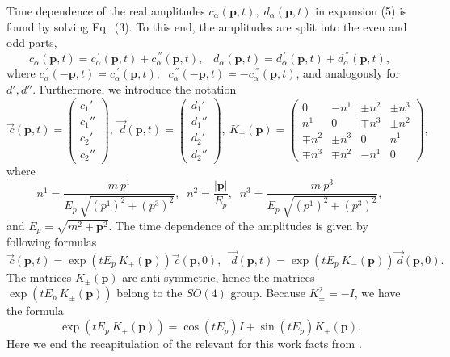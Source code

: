 \documentclass[12pt]{article}
\begin{document}
Time dependence of the real amplitudes $ c_{\alpha}(\mathbf{p},t), \;  d_{\alpha}(\mathbf{p},t) $ in expansion (5) is found  by solving Eq.\ (3). To this end,  the amplitudes are split into the even and odd parts, 
\[ c_{\alpha}(\mathbf{p},t) =  c_{\alpha}^{\:'}(\mathbf{p},t) +  c_{\alpha}^{\:''}(\mathbf{p},t),  \;\;\; d_{\alpha}(\mathbf{p},t) =  d_{\alpha}^{\:'}(\mathbf{p},t) +  d_{\alpha}^{\:''}(\mathbf{p},t),   \]
where $c_{\alpha}^{\:'}(- \mathbf{p},t) = c_{\alpha}^{\:'}(\mathbf{p},t), $ $\;c_{\alpha}^{\:''}(- \mathbf{p},t) =- c_{\alpha}^{\:''}(\mathbf{p},t)$, and analogously for $d', d''$. Furthermore, we  introduce the notation    
\[ \vec{\:c}(\mathbf{p},t) =  \left(\begin{array}{c} c_1' \\ c_1''\\ c_2'\\ c_2'' \end{array} \right)\!\!, \:
 \vec{\:d}(\mathbf{p},t) =  \left(\begin{array}{c} d_1' \\ d_1''\\ d_2'\\ d_2'' \end{array} \right)\!\!,\:  K_{\pm}(\mathbf{p}) = \left(\begin{array}{cccc} 0 & -n^1& \pm n^2&\pm n^3\\ n^1& 0 &\mp n^3 &\pm n^2\\ \mp n^2& \pm n^3 &0& n^1 \\ \mp n^3 & \mp n^2 & - n^1 &0 \end{array}\right)\!\!,  \]
where
\[  n^1= \frac{m\: p^1}{E_p \:\sqrt{(p^1)^2 + (p^3)^2}}, \;\; n^2 =  \frac{|\mathbf{p}|}{E_p}, \;\;  n^3= \frac{m \: p^3}{E_p\: \sqrt{(p^1)^2 + (p^3)^2}}, \] and  $ E_p=\sqrt{m^2 + \mathbf{p}^2}$.   
The time dependence of the amplitudes is  given by following formulas \cite{10}
\begin{equation} \vec{\:c}(\mathbf{p},t) =  \exp(t E_p \: K_+(\mathbf{p}))     \vec{\:c}(\mathbf{p},0),   \;\; \vec{\:d}(\mathbf{p},t) = \exp(t E_p\: K_-(\mathbf{p}))     \vec{\:d}(\mathbf{p},0).    \end{equation}
The  matrices $K_{\pm}(\mathbf{p})$ are anti-symmetric,  hence the matrices $ \exp(t E_p\: K_{\pm}(\mathbf{p}))$ belong to the $SO(4)$ group.   Because $K_{\pm}^2 = - I$,  we  have the formula
\begin{equation} \exp(t E_p\: K_{\pm}(\mathbf{p})) =  \cos(t E_p) I + \sin(t E_p) K_{\pm}(\mathbf{p}).  \end{equation}
Here we end the recapitulation of the relevant for this work facts from \cite{10}.   
\end{document}
